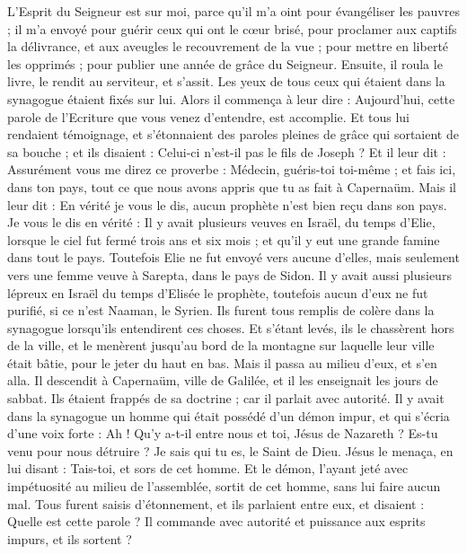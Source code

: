 \begin{multicols}{2}
L'Esprit du Seigneur est sur moi, parce qu'il m'a oint pour évangéliser les pauvres ; il m’a envoyé pour guérir ceux qui ont le cœur brisé,
pour proclamer aux captifs la délivrance, et aux aveugles le recouvrement de la vue ; pour mettre en liberté les opprimés ; pour publier une année de grâce du Seigneur.
Ensuite, il roula le livre, le rendit au serviteur, et s'assit. Les yeux de tous ceux qui étaient dans la synagogue étaient fixés sur lui.
Alors il commença à leur dire : Aujourd'hui, cette parole de l’Ecriture que vous venez d’entendre, est accomplie.
Et tous lui rendaient témoignage, et s'étonnaient des paroles pleines de grâce qui sortaient de sa bouche ; et ils disaient : Celui-ci n'est-il pas le fils de Joseph ?
Et il leur dit : Assurément vous me direz ce proverbe : Médecin, guéris-toi toi-même ; et fais ici, dans ton pays, tout ce que nous avons appris que tu as fait à Capernaüm.
Mais il leur dit : En vérité je vous le dis, aucun prophète n'est bien reçu dans son pays.
Je vous le dis en vérité : Il y avait plusieurs veuves en Israël, du temps d'Elie, lorsque le ciel fut fermé trois ans et six mois ; et qu'il y eut une grande famine dans tout le pays.
Toutefois Elie ne fut envoyé vers aucune d'elles, mais seulement vers une femme veuve à Sarepta, dans le pays de Sidon.
Il y avait aussi plusieurs lépreux en Israël du temps d'Elisée le prophète, toutefois aucun d'eux ne fut purifié, si ce n’est Naaman, le Syrien.
Ils furent tous remplis de colère dans la synagogue lorsqu’ils entendirent ces choses.
Et s'étant levés, ils le chassèrent hors de la ville, et le menèrent jusqu'au bord de la montagne sur laquelle leur ville était bâtie, pour le jeter du haut en bas.
Mais il passa au milieu d'eux, et s'en alla.
Il descendit à Capernaüm, ville de Galilée, et il les enseignait les jours de sabbat.
Ils étaient frappés de sa doctrine ; car il parlait avec autorité.
Il y avait dans la synagogue un homme qui était possédé d'un démon impur, et qui s'écria d’une voix forte :
Ah ! Qu’y a-t-il entre nous et toi, Jésus de Nazareth ? Es-tu venu pour nous détruire ? Je sais qui tu es, le Saint de Dieu.
Jésus le menaça, en lui disant : Tais-toi, et sors de cet homme. Et le démon, l’ayant jeté avec impétuosité au milieu de l'assemblée, sortit de cet homme, sans lui faire aucun mal.
Tous furent saisis d'étonnement, et ils parlaient entre eux, et disaient : Quelle est cette parole ? Il commande avec autorité et puissance aux esprits impurs, et ils sortent ?

\end{multicols}
